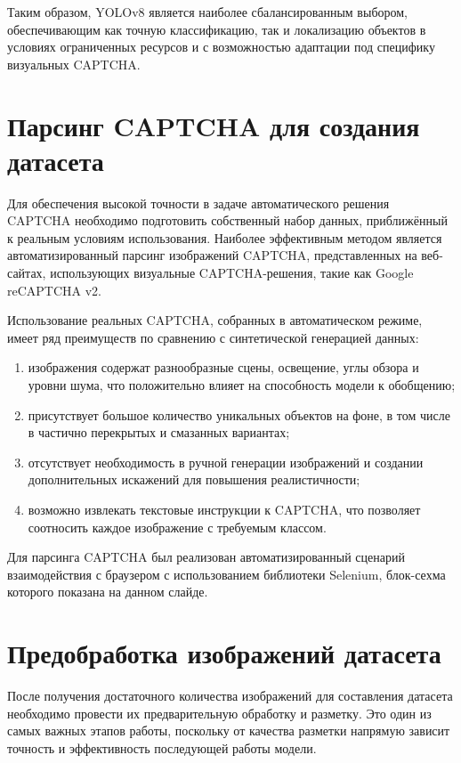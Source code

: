 \documentclass{altsu-report}
\begin{document}
Таким образом, YOLOv8 является наиболее сбалансированным выбором, обеспечивающим как точную классификацию, так и локализацию объектов в условиях ограниченных ресурсов и с возможностью адаптации под специфику визуальных CAPTCHA.

\section*{Парсинг CAPTCHA для создания датасета}

Для обеспечения высокой точности в задаче автоматического решения CAPTCHA необходимо подготовить собственный набор данных, приближённый к реальным условиям использования. Наиболее эффективным методом является автоматизированный парсинг изображений CAPTCHA, представленных на веб-сайтах, использующих визуальные CAPTCHA-решения, такие как Google reCAPTCHA v2.

Использование реальных CAPTCHA, собранных в автоматическом режиме, имеет ряд преимуществ по сравнению с синтетической генерацией данных:

\begin{enumerate}
    \item изображения содержат разнообразные сцены, освещение, углы обзора и уровни шума, что положительно влияет на способность модели к обобщению;
    \item присутствует большое количество уникальных объектов на фоне, в том числе в частично перекрытых и смазанных вариантах;
    \item отсутствует необходимость в ручной генерации изображений и создании дополнительных искажений для повышения реалистичности;
    \item возможно извлекать текстовые инструкции к CAPTCHA, что позволяет соотносить каждое изображение с требуемым классом.
\end{enumerate}

Для парсинга CAPTCHA был реализован автоматизированный сценарий взаимодействия с браузером с использованием библиотеки Selenium, блок-сехма которого показана на данном слайде.

\section*{Предобработка изображений датасета}

После получения достаточного количества изображений для составления датасета необходимо провести их предварительную обработку и разметку. Это один из самых важных этапов работы, поскольку от качества разметки напрямую зависит точность и эффективность последующей работы модели.
\end{document}
